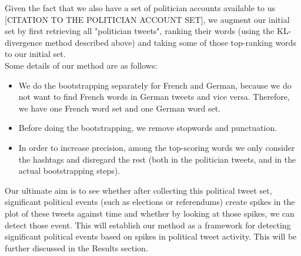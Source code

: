 Given the fact that we also have a set of politician accounts available to us [CITATION TO THE POLITICIAN ACCOUNT SET], we augment our initial set by first retrieving all "politician tweets", ranking their words (using the KL-divergence method described above) and taking some of those top-ranking words to our initial set. \\
Some details of our method are as follows:
\begin{itemize}
  \item We do the bootstrapping separately for French and German, because we do not want to find French words in German tweets and vice versa. Therefore, we have one French word set and one German word set.
  \item Before doing the bootstrapping, we remove stopwords and punctuation.
  \item In order to increase precision, among the top-scoring words we only consider the hashtags and disregard the rest (both in the politician tweets, and in the actual bootstrapping steps).
\end{itemize}
Our ultimate aim is to see whether after collecting this political tweet set, significant political events (such as elections or referendums) create spikes in the plot of these tweets against time and whether by looking at those spikes, we can detect those event. This will establish our method as a framework for detecting significant political events based on spikes in political tweet activity. This will be further discussed in the Results section.